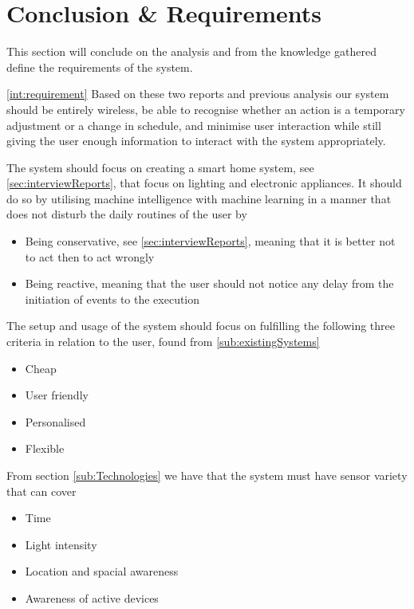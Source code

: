 \section{Conclusion \& Requirements}\label{sec:requirements}
This section will conclude on the analysis and from the knowledge gathered define the requirements of the system.

\cref{int:requirement} Based on these two reports and previous analysis our system should be entirely wireless, be able to recognise whether an action is a temporary adjustment or a change in schedule, and minimise user interaction while still giving the user enough information to interact with the system appropriately.

The system should focus on creating a smart home system, see \cref{sec:interviewReports}, that focus on lighting and electronic appliances. It should do so by utilising machine intelligence with machine learning in a manner that does not disturb the daily routines of the user by
\begin{itemize}
  \item Being conservative, see \cref{sec:interviewReports}, meaning that it is better not to act then to act wrongly
  \item Being reactive, meaning that the user should not notice any delay from the initiation of events to the execution
\end{itemize}

The setup and usage of the system should focus on fulfilling the following three criteria in relation to the user, found from \cref{sub:existingSystems}
\begin{itemize}
  \item Cheap
  \item User friendly
  \item Personalised
  \item Flexible
\end{itemize}

From section \cref{sub:Technologies} we have that the system must have sensor variety that can cover
\begin{itemize}
  \item Time
  \item Light intensity
  \item Location and spacial awareness
  \item Awareness of active devices
\end{itemize}

